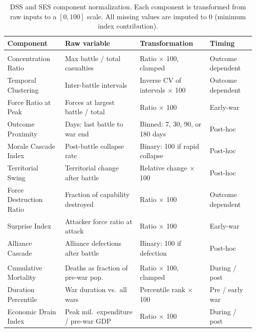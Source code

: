 \begin{table}[H]
\centering
\caption{DSS and SES component normalization. Each component is transformed from raw inputs to a $[0, 100]$ scale. All missing values are imputed to 0 (minimum index contribution).}
\label{tab:normalization}
\scriptsize
\setlength{\tabcolsep}{3pt}
\renewcommand{\arraystretch}{1.15}
\begin{tabularx}{\textwidth}{@{}
>{\RaggedRight\arraybackslash}p{}
>{\RaggedRight\arraybackslash}p{}
>{\RaggedRight\arraybackslash}X
>{\RaggedRight\arraybackslash}p{}
@{}}
\toprule
\textbf{Component} &
\textbf{Raw variable} &
\textbf{Transformation} &
\textbf{Timing} \\
\midrule
\multicolumn{4}{@{}l}{\textit{DSS Components}} \\
\midrule
Concentration Ratio & Max battle / total casualties & Ratio $\times$ 100, clamped & Outcome dependent \\
Temporal Clustering & Inter-battle intervals & Inverse CV of intervals $\times$ 100 & Outcome dependent \\
Force Ratio at Peak & Forces at largest battle / total & Ratio $\times$ 100 & Early-war \\
Outcome Proximity & Days: last battle to war end & Binned: 7, 30, 90, or 180 days & Post-hoc \\
Morale Cascade Index & Post-battle collapse rate & Binary: 100 if rapid collapse & Post-hoc \\
Territorial Swing & Territorial change after battle & Relative change $\times$ 100 & Post-hoc \\
Force Destruction Ratio & Fraction of capability destroyed & Ratio $\times$ 100 & Outcome dependent \\
Surprise Index & Attacker force ratio at attack & Ratio $\times$ 100 & Early-war \\
Alliance Cascade & Alliance defections after battle & Binary: 100 if defection & Post-hoc \\
\midrule
\multicolumn{4}{@{}l}{\textit{SES Components}} \\
\midrule
Cumulative Mortality & Deaths as fraction of pre-war pop. & Ratio $\times$ 100, clamped & During / post \\
Duration Percentile & War duration vs.\ all wars & Percentile rank $\times$ 100 & Pre / early war \\
Economic Drain Index & Peak mil.\ expenditure / pre-war GDP & Ratio $\times$ 100 & During / post \\

\end{tabularx}
\end{table}
